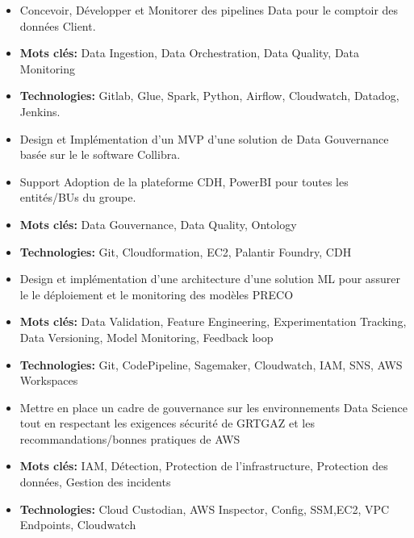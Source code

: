 \documentclass[10pt,a4paper,normalphoto]{altacv}
\begin{document}
\begin{paracol}{2}

\begin{itemize}
    \item Concevoir, Développer et Monitorer des pipelines Data pour le comptoir des données Client.
    \item \textbf{Mots clés: } Data Ingestion, Data Orchestration, Data Quality, Data Monitoring
    \item \textbf{Technologies:} Gitlab, Glue, Spark, Python, Airflow, Cloudwatch, Datadog, Jenkins.
\end{itemize}
\divider

\begin{itemize}
    \item Design et Implémentation d'un MVP d'une solution de Data Gouvernance basée sur le le software Collibra.
    \item Support Adoption de la plateforme CDH, PowerBI pour toutes les entités/BUs du groupe.
    \item \textbf{Mots clés: } Data Gouvernance, Data Quality, Ontology
    \item \textbf{Technologies:} Git, Cloudformation, EC2, Palantir Foundry, CDH
\end{itemize}
\divider

\begin{itemize}
\item Design et implémentation d'une architecture d'une solution ML pour assurer le le déploiement et le monitoring des modèles PRECO
\item \textbf{Mots clés: } Data Validation, Feature Engineering, Experimentation Tracking, Data Versioning, Model Monitoring, Feedback loop
\item \textbf{Technologies:} Git, CodePipeline, Sagemaker, Cloudwatch, IAM, SNS, AWS Workspaces
\end{itemize}
\divider

\begin{itemize}
\item Mettre en place un cadre de gouvernance sur les environnements Data Science tout en respectant les exigences sécurité de GRTGAZ et les recommandations/bonnes pratiques de AWS
\item \textbf{Mots clés:} IAM, Détection, Protection de l'infrastructure, Protection des données, Gestion des incidents
\item \textbf{Technologies:} Cloud Custodian, AWS Inspector, Config, SSM,EC2, VPC Endpoints, Cloudwatch
\end{itemize}
\divider


\end{paracol}
\end{document}
